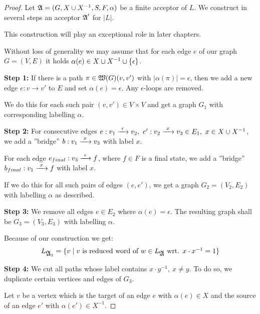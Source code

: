 \begin{proof}
Let $\mbox{$\mathfrak{A}$} = (G, X \cup {X}^{-1}, S, F, \alpha)$ be a finite acceptor of $L$. We
construct in several steps an acceptor $\mbox{$\mathfrak{A}$}'$ for $|L|$.

This construction will play an exceptional role in later chapters.

Without loss of generality we may assume that for each edge $e$ of our graph $G
= (V, E)$ it holds $\alpha(e) \in X \cup {X}^{-1} \cup \mbox{$\{\epsilon\}$}$.

{\bf Step 1:} If there is a path $\pi \in \mbox{$\mathfrak{W}(G)$}(v, v')$ with
$|\alpha(\pi)| = \epsilon$, then we add a new edge $e: v \to v'$ to $E$ and set
$\alpha(e) = \epsilon$. Any $\epsilon$-loops are removed.

\begin{center}

\end{center}

We do this for each such pair $(v, v')\in V \times V$ and get a graph $G_1$ with
corresponding labelling $\alpha$.

{\bf Step 2:} For consecutive edges $e: v_1 \xrightarrow{\ {\epsilon}\ } v_2,\ e': v_2
\xrightarrow{\ {x}\ } v_3 \in E_1,\ x \in X \cup {X}^{-1}$, we add a ''bridge'' $b: v_1 \xrightarrow{\ {x}\ }
v_3$ with label $x$.

For each edge $e_{final}: v_3 \xrightarrow{\ {\epsilon}\ } f$, where $f \in F$ is a final
state, we add a ''bridge'' $b_{final}: v_1 \xrightarrow{\ {x}\ } f$ with label $x$.

\begin{center}

\end{center}

If we do this for all such pairs of edges $(e, e')$, we get a graph
$G_2=(V_2,E_2)$ with labelling $\alpha$ as described.

{\bf Step 3:} We remove all edges $e \in E_2$ where $\alpha(e) = \epsilon$. The
resulting graph shall be $G_3=(V_3,E_3)$ with labelling $\alpha$.

Because of our construction we get:
\[ L_{\mbox{$\mathfrak{A}$}_3} = \mbox{$\{v \mid v \mbox{ is reduced word of } w \in
L_{\mbox{$\mathfrak{A}$}} \mbox{ wrt. } x \cdot x^{-1} = 1\}$} \]

{\bf Step 4:} We cut all paths whose label contains $x \cdot y^{-1},\
x\neq y$. To do so, we duplicate certain vertices and edges of $G_3$.

Let $v$ be a vertex which is the target of an edge $e$ with $\alpha(e) \in X$
and the source of an edge $e'$ with $\alpha(e') \in X^{-1}$.


\end{proof}
